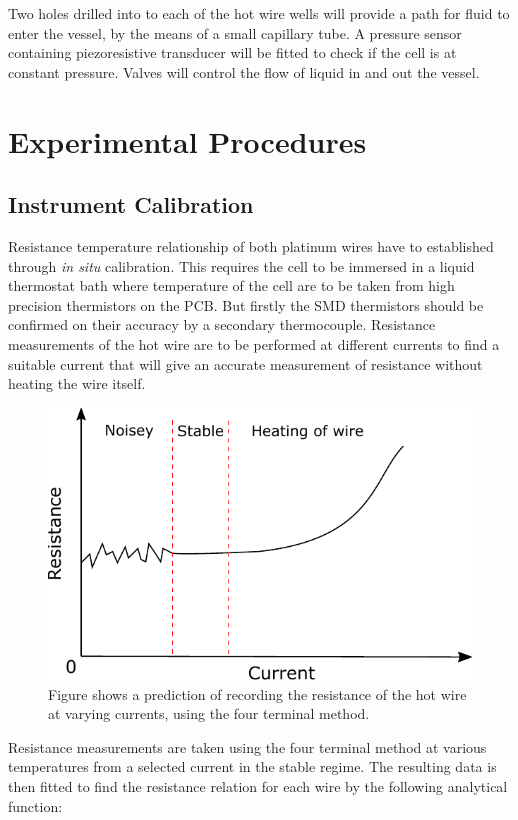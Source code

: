 \documentclass[12pt,MEng]{UoAThesis}
\begin{document}
Two holes drilled into to each of the hot wire wells will provide a path for fluid to enter the vessel, by the means of a small capillary tube. A pressure sensor containing piezoresistive transducer will be fitted to check if the cell is at constant pressure. Valves will control the flow of liquid in and out the vessel.

\section{Experimental Procedures}

\subsection{Instrument Calibration}
Resistance temperature relationship of both platinum wires have to established through \emph{in situ} calibration. This requires the cell to be immersed in a liquid thermostat bath where temperature of the cell are to be taken from high precision thermistors on the PCB. But firstly the SMD thermistors should be confirmed on their accuracy by a secondary thermocouple. Resistance measurements of the hot wire are to be performed at different currents to find a suitable current that will give an accurate measurement of resistance without heating the wire itself. 

\begin{figure}[htp]
  \centering
  \includegraphics[clip,width=0.6\linewidth]{figures/cal.pdf}
  \caption{\label{fig:cal} Figure shows a prediction of recording the resistance of the hot wire at varying currents, using the four terminal method.}
\end{figure}

\noindent Resistance measurements are taken using the four terminal method at various temperatures from a selected current in the stable regime. The resulting data is then fitted to find the resistance relation for each wire by the following analytical function: 
\end{document}
